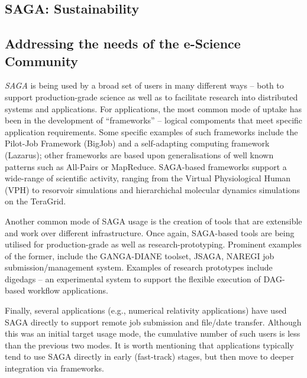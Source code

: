 \documentclass[a4paper,10pt]{article}
\newcommand{\sagaimpl}{\textit{SAGA}\xspace}
\newcommand{\impl}{\sagaimpl}
\newcommand{\note}[1]{ {\textcolor{red} { ***NOTE: #1 }}}
\newcommand{\jhanote}[1]{  {\textcolor{red}     { ***Shantenu: #1 }}}
\newcommand{\jhanote}[1]{}
\begin{document}
\vspace{-0.8em}

\subsection*{SAGA: Sustainability}
\vspace{-0.5em}
\subsection*{Addressing the needs of the e-Science Community}

 \impl is being used by a broad set of users in many different ways -- both to
 support production-grade science as well as to facilitate research into
 distributed systems and applications.  For applications, the most common mode
 of uptake has been in the development of ``frameworks'' -- logical compoments
 that meet specific application requirements. Some specific examples of such
 frameworks include the Pilot-Job Framework (BigJob) and a self-adapting
 computing framework (Lazarus); other frameworks are based upon generalisations
 of well known patterns such as All-Pairs or MapReduce.  SAGA-based frameworks
 support a wide-range of scientific activity, ranging from the Virtual
 Physiological Human (VPH) to resorvoir simulations and hierarchichal molecular
 dynamics simulations on the TeraGrid.

 Another common mode of SAGA usage is the creation of tools that are
 extensible and work over different infrastructure. Once again,
 SAGA-based tools are being utilised for production-grade as well as
 research-prototyping. Prominent examples of the former, include the
 GANGA-DIANE toolset, JSAGA, NAREGI job submission/management system.
 Examples of research prototypes include digedags -- an experimental
 system to support the flexible execution of DAG-based workflow
 applications.

 Finally, several applications (e.g., numerical relativity
 applications) have used SAGA directly to support remote job
 submission and file/date transfer. Although this was an initial
 target usage mode, the cumulative number of such users is less than
 the previous two modes. It is worth mentioning that applications
 typically tend to use SAGA directly in early (fast-track) stages, but
 then move to deeper integration via frameworks.  \vspace{-0.8em}
 \pagebreak
\end{document}
